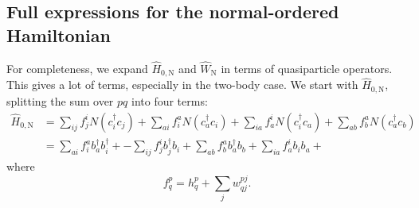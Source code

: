 \documentclass{report}
\theoremstyle{plain}
\theoremstyle{definition}
\begin{document}
\subsection{Full expressions for the normal-ordered Hamiltonian}

For completeness, we expand $\hat{H}_{0,\text{N}}$ and $\hat{W}_\text{N}$
in terms of quasiparticle operators. This gives a lot of terms,
especially in the two-body case. We start with $\hat{H}_{0,\text{N}}$,
splitting the sum over $pq$ into four terms:
\begin{equation}
  \begin{split}
    \hat{H}_{0,\text{N}} &= \sum_{ij} {f}^i_{j} N(c^\dag_i c_j) +
    \sum_{ai} f^a_{i} N(c^\dag_a c_i) +
    \sum_{ia} f^i_{a} N(c^\dag_i c_a) +
    \sum_{ab} f^a_{b} N(c^\dag_a c_b) 
     \\
    & = \sum_{ai} f^a_{i} b^\dag_a b^\dag_i +
    -\sum_{ij} f^i_{j} b^\dag_j b_i +
    \sum_{ab} f^a_{b} b^\dag_a b_b +
    \sum_{ia} f^i_{a} b_i b_a +
    \label{eq:normal-order-onebody-2}
  \end{split}
\end{equation}
where 
\begin{equation}
  f^p_q = h^p_q + \sum_j w^{pj}_{qj}.
\end{equation}
\end{document}

